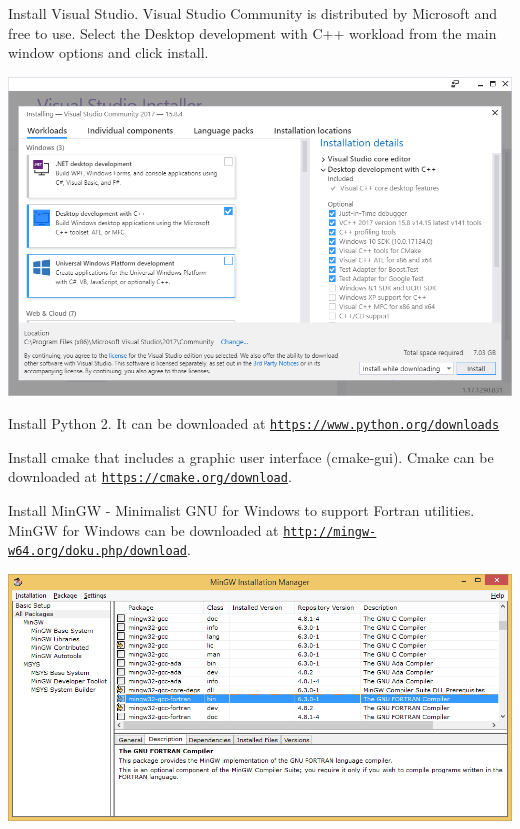 \begin{DoxyEnumerate}
\item Install Visual Studio. Visual Studio Community is distributed by Microsoft and free to use. Select the {\ttfamily Desktop development with C++} workload from the main window options and click install. 
\begin{DoxyImage}
\includegraphics[width=15cm]{VSC2017_step1.png}
\end{DoxyImage}
  
\item Install Python 2. It can be downloaded at \href{https://www.python.org/downloads/}{\tt https\+://www.\+python.\+org/downloads}
\item Install cmake that includes a graphic user interface (cmake-\/gui). Cmake can be downloaded at \href{https://cmake.org/download/}{\tt https\+://cmake.\+org/download}.
\item Install Min\+GW -\/ Minimalist G\+NU for Windows to support Fortran utilities. Min\+GW for Windows can be downloaded at \href{http://mingw-w64.org/doku.php/download}{\tt http\+://mingw-\/w64.\+org/doku.\+php/download}. 
\begin{DoxyImage}
\includegraphics[width=15cm]{mingw64_selectoptions.png}
\end{DoxyImage}
  

\end{DoxyEnumerate}
